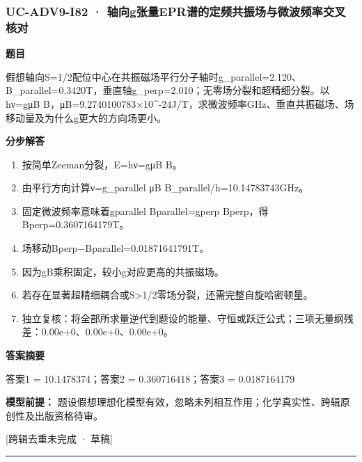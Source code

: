 \documentclass[UTF8,11pt,a4paper]{ctexart}
\begin{document}
\subsubsection*{UC-ADV9-I82 · 轴向g张量EPR谱的定频共振场与微波频率交叉核对}
\noindent\textbf{题目}\par
假想轴向S=1/2配位中心在共振磁场平行分子轴时g\_parallel=2.120、B\_parallel=0.3420T，垂直轴g\_perp=2.010；无零场分裂和超精细分裂。以hν=gμB B，μB=9.2740100783×10\textasciicircum{}-24J/T，求微波频率GHz、垂直共振磁场、场移动量及为什么g更大的方向场更小。\par
\medskip\noindent\textbf{分步解答}
\begin{enumerate}
\item 按简单Zeeman分裂，E=hν=gμB B。
\item 由平行方向计算ν=g\_parallel μB B\_parallel/h=10.14783743GHz。
\item 固定微波频率意味着gparallel Bparallel=gperp Bperp，得Bperp=0.3607164179T。
\item 场移动Bperp−Bparallel=0.01871641791T。
\item 因为gB乘积固定，较小g对应更高的共振磁场。
\item 若存在显著超精细耦合或S>1/2零场分裂，还需完整自旋哈密顿量。
\item 独立复核：将全部所求量逆代到题设的能量、守恒或跃迁公式；三项无量纲残差：0.00e+0、0.00e+0、0.00e+0。
\end{enumerate}
\noindent\textbf{答案摘要}\par
答案1 = 10.1478374；答案2 = 0.360716418；答案3 = 0.0187164179\par
\noindent\textbf{模型前提：}
题设假想理想化模型有效，忽略未列相互作用；化学真实性、跨辑原创性及出版资格待审。\par
\noindent\textcolor{red!65!black}{[跨辑去重未完成 · 草稿]} \par
\medskip\hrule\medskip
{}
\end{document}
